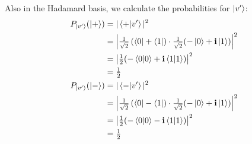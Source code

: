 \begin{enumerate}[label=\alph*.,ref={Sol.~\thesection\alph*}]
    Also in the Hadamard basis, we calculate the probabilities for $\ket{v'}$:
    \begin{align}
        P_{\ket{v'}}(\ket{+}) &= |\bra{+} \ket{v'}|^2 \nonumber \\
        &= \left |\tfrac{1}{\sqrt{2}} \left (\bra{0} + \bra{1} \right ) \cdot \tfrac{1}{\sqrt{2}} (-\ket{0} + \mathbf{i} \ket{1}) \right |^2 \nonumber \\
        &= \left | \tfrac{1}{2} (-\braket{0} + \mathbf{i} \braket{1}) \right |^2 \nonumber \\
        &= \tfrac{1}{2} \nonumber \\
        P_{\ket{v'}}(\ket{-}) &= |\bra{-} \ket{v'}|^2 \nonumber \\
        &= \left |\tfrac{1}{\sqrt{2}} \left (\bra{0} - \bra{1} \right ) \cdot \tfrac{1}{\sqrt{2}} (-\ket{0} + \mathbf{i} \ket{1}) \right |^2 \nonumber \\
        &= \left | \tfrac{1}{2} (-\braket{0} - \mathbf{i} \braket{1}) \right |^2 \nonumber \\
        &= \tfrac{1}{2} \nonumber \\
    \end{align}


\end{enumerate}
